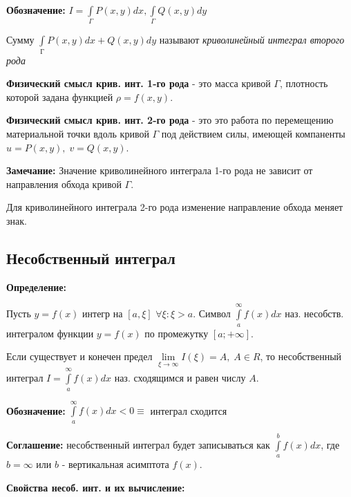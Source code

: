 \documentclass[a4paper,12pt]{article} %
\begin{document}
\textbf{Обозначение:} $I = \int\limits_\Gamma P(x,y)dx, \int\limits_\Gamma Q(x,y)dy$

\vspace{20}

Сумму $\int\limits_Г P(x,y)dx + Q(x,y) dy$ называют \textit{криволинейный интеграл второго рода}

\vspace{20}

\textbf{Физический смысл крив. инт. 1-го рода} - это масса кривой $\Gamma$, плотность которой задана функцией $\rho = f(x,y)$.

\vspace{20}

\textbf{Физический смысл крив. инт. 2-го рода} - это это работа по перемещению материальной точки вдоль кривой $\Gamma$ под действием силы, имеющей компаненты $u=P(x,y),\; v=Q(x,y)$.  

\vspace{20}

\textbf{Замечание:} Значение криволинейного интеграла 1-го рода не зависит от направления обхода кривой $\Gamma$.

Для криволинейного интеграла 2-го рода изменение направление обхода меняет знак.

\subsection*{Несобственный интеграл}

\textbf{Определение:} 

Пусть $y=f(x)$ интегр на $[a, \xi]$ $\forall \xi:\xi>a $. Символ $\int\limits_a^{\infty} f(x) dx   $ наз. несобств. интегралом функции $y=f(x)$ по промежутку $[a; +\infty]$.

Если существует и конечен предел $\lim\limits_{\xi \rightarrow \infty} I(\xi) = A, \; A\in R$, то несобственный интеграл $I=\int\limits_a^{\infty} f(x) dx$ наз. сходящимся и равен числу $A$.

\textbf{Обозначение:} $\int\limits_a^{\infty} f(x) dx < 0 \equiv$ интеграл сходится 

\textbf{Соглашение:} несобственный интеграл будет записываться как $\int\limits_a^{b} f(x) dx$, где $b = \infty$ или $b$ - вертикальная асимптота $f(x)$. 

\vspace{20}

\textbf{Свойства несоб. инт. и их вычисление:}
\end{document}
